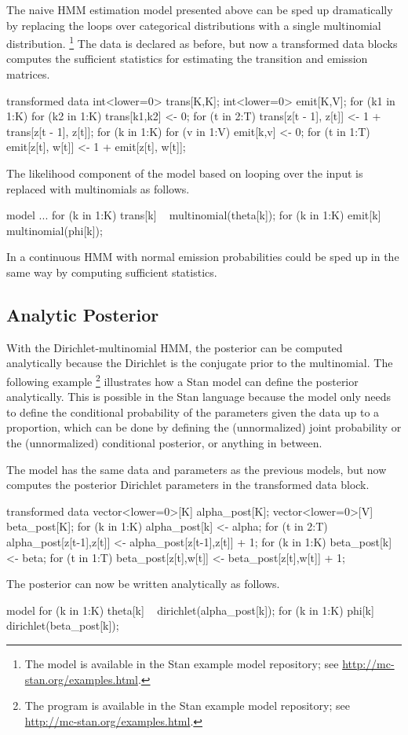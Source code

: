 The naive HMM estimation model presented above can be sped up
dramatically by replacing the loops over categorical distributions
with a single multinomial distribution.%
%
\footnote{The model is available in the Stan example model repository;
see \url{http://mc-stan.org/examples.html}.}
%
The data is declared as before, but now a transformed data blocks
computes the sufficient statistics for estimating the transition and
emission matrices.
%
\begin{stancode}
transformed data {
  int<lower=0> trans[K,K];
  int<lower=0> emit[K,V];
  for (k1 in 1:K) 
    for (k2 in 1:K)
      trans[k1,k2] <- 0;
  for (t in 2:T)
    trans[z[t - 1], z[t]] <- 1 + trans[z[t - 1], z[t]];
  for (k in 1:K)
    for (v in 1:V)
      emit[k,v] <- 0;
  for (t in 1:T)
    emit[z[t], w[t]] <- 1 + emit[z[t], w[t]];
}
\end{stancode}
%
The likelihood component of the model based on looping over the input
is replaced with multinomials as follows.
%
\begin{stancode}
model {
  ...
  for (k in 1:K)
    trans[k] ~ multinomial(theta[k]);
  for (k in 1:K)
    emit[k] ~ multinomial(phi[k]);
}
\end{stancode}
%
In a continuous HMM with normal emission probabilities could be sped
up in the same way by computing sufficient statistics.

\subsection{Analytic Posterior}

With the Dirichlet-multinomial HMM, the posterior can be computed
analytically because the Dirichlet is the conjugate prior to the
multinomial.  The following example
%
\footnote{The program is available in the Stan example model repository;
see \url{http://mc-stan.org/examples.html}.}
%
illustrates how a Stan model can define the posterior analytically.
This is possible in the Stan language because the model only needs to
define the conditional probability of the parameters given the data up
to a proportion, which can be done by defining the (unnormalized)
joint probability or the (unnormalized) conditional posterior, or
anything in between.

The model has the same data and parameters as the previous models, but
now computes the posterior Dirichlet parameters in the transformed
data block.
%
\begin{stancode}
transformed data {
  vector<lower=0>[K] alpha_post[K];
  vector<lower=0>[V] beta_post[K];
  for (k in 1:K) 
    alpha_post[k] <- alpha;
  for (t in 2:T)
    alpha_post[z[t-1],z[t]] <- alpha_post[z[t-1],z[t]] + 1;
  for (k in 1:K)
    beta_post[k] <- beta;
  for (t in 1:T)
    beta_post[z[t],w[t]] <- beta_post[z[t],w[t]] + 1;
}
\end{stancode}
%
The posterior can now be written analytically as follows.
%
\begin{stancode}
model {
  for (k in 1:K) 
    theta[k] ~ dirichlet(alpha_post[k]);
  for (k in 1:K)
    phi[k] ~ dirichlet(beta_post[k]);
}
\end{stancode}


